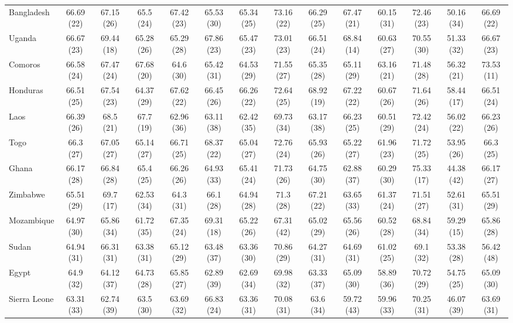 {\begin{longtable}{lccccccccccccc}
Bangladesh & 66.69 (22) & 67.15 (26) & 65.5 (24) & 67.42 (23) & 65.53 (30) & 65.34 (25) & 73.16 (22) & 66.29 (25) & 67.47 (21) & 60.15 (31) & 72.46 (23) & 50.16 (34) & 66.69 (22) \\ 
Uganda & 66.67 (23) & 69.44 (18) & 65.28 (26) & 65.29 (28) & 67.86 (23) & 65.47 (23) & 73.01 (23) & 66.51 (24) & 68.84 (14) & 60.63 (27) & 70.55 (30) & 51.33 (32) & 66.67 (23) \\ 
Comoros & 66.58 (24) & 67.47 (24) & 67.68 (20) & 64.6 (30) & 65.42 (31) & 64.53 (29) & 71.55 (27) & 65.35 (28) & 65.11 (29) & 63.16 (21) & 71.48 (28) & 56.32 (21) & 73.53 (11) \\ 
Honduras & 66.51 (25) & 67.54 (23) & 64.37 (29) & 67.62 (22) & 66.45 (26) & 66.26 (22) & 72.64 (25) & 68.92 (19) & 67.22 (22) & 60.67 (26) & 71.64 (26) & 58.44 (17) & 66.51 (24) \\ 
Laos & 66.39 (26) & 68.5 (21) & 67.7 (19) & 62.96 (36) & 63.11 (38) & 62.42 (35) & 69.73 (34) & 63.17 (38) & 66.23 (25) & 60.51 (29) & 72.42 (24) & 56.02 (22) & 66.23 (26) \\ 
Togo & 66.3 (27) & 67.05 (27) & 65.14 (27) & 66.71 (25) & 68.37 (22) & 65.04 (27) & 72.76 (24) & 65.93 (26) & 65.22 (27) & 61.96 (23) & 71.72 (25) & 53.95 (26) & 66.3 (25) \\ 
Ghana & 66.17 (28) & 66.84 (28) & 65.4 (25) & 66.26 (26) & 64.93 (33) & 65.41 (24) & 71.73 (26) & 64.75 (30) & 62.88 (37) & 60.29 (30) & 75.33 (17) & 44.38 (42) & 66.17 (27) \\ 
Zimbabwe & 65.51 (29) & 69.7 (17) & 62.53 (34) & 64.3 (31) & 66.1 (28) & 64.94 (28) & 71.3 (28) & 67.21 (22) & 63.65 (33) & 61.37 (24) & 71.51 (27) & 52.61 (31) & 65.51 (29) \\ 
Mozambique & 64.97 (30) & 65.86 (34) & 61.72 (35) & 67.35 (24) & 69.31 (18) & 65.22 (26) & 67.31 (42) & 65.02 (29) & 65.56 (26) & 60.52 (28) & 68.84 (34) & 59.29 (15) & 65.86 (28) \\ 
Sudan & 64.94 (31) & 66.31 (31) & 63.38 (31) & 65.12 (29) & 63.48 (37) & 63.36 (30) & 70.86 (29) & 64.27 (31) & 64.69 (31) & 61.02 (25) & 69.1 (32) & 53.38 (28) & 56.42 (48) \\ 
Egypt & 64.9 (32) & 64.12 (37) & 64.73 (28) & 65.85 (27) & 62.89 (39) & 62.69 (34) & 69.98 (32) & 63.33 (37) & 65.09 (30) & 58.89 (36) & 70.72 (29) & 54.75 (25) & 65.09 (30) \\ 
Sierra Leone & 63.31 (33) & 62.74 (39) & 63.5 (30) & 63.69 (32) & 66.83 (24) & 63.36 (31) & 70.08 (31) & 63.6 (34) & 59.72 (43) & 59.96 (33) & 70.25 (31) & 46.07 (39) & 63.69 (31) \\ 

\end{longtable}}

